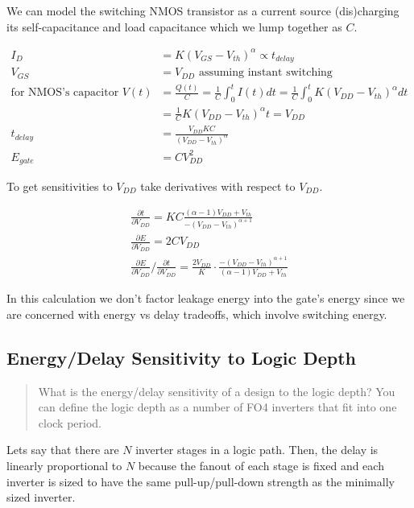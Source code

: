 \documentclass[11pt]{article}
\begin{document}
We can model the switching NMOS transistor as a current source (dis)charging its self-capacitance and load capacitance which we lump together as $C$.

\begin{align}
	I_D &= K (V_{GS} - V_{th})^\alpha \propto t_{delay} \nonumber \\
	V_{GS} &= V_{DD} \text{ assuming instant switching} \nonumber \\
	\text{for NMOS's capacitor } V(t) &= \frac{Q(t)}{C} = \frac{1}{C}\int_{0}^{t}I(t) dt = \frac{1}{C}\int_{0}^{t} K (V_{DD} - V_{th})^\alpha dt \nonumber \\
	&= \frac{1}{C} K (V_{DD} - V_{th})^\alpha t = V_{DD} \nonumber \\
	t_{delay} &= \frac{V_{DD} K C}{(V_{DD} - V_{th})^\alpha} \nonumber \\
	E_{gate} &= C V_{DD}^2 \nonumber
\end{align}

To get sensitivities to $V_{DD}$ take derivatives with respect to $V_{DD}$.

\begin{align}
	\frac{\partial t}{\partial V_{DD}} = K C \frac{(\alpha - 1)V_{DD} + V_{th}}{-(V_{DD} - V_{th})^{\alpha + 1}} \nonumber \\
	\frac{\partial E}{\partial V_{DD}} = 2 C V_{DD} \nonumber \\
	\frac{\partial E}{\partial V_{DD}} \bigg/ \frac{\partial t}{\partial V_{DD}} = \frac{2 V_{DD}}{K} \cdot \frac{-(V_{DD} - V_{th})^{\alpha+1}}{(\alpha - 1)V_{DD} + V_{th}} \nonumber 
\end{align}

In this calculation we don't factor leakage energy into the gate's energy since we are concerned with energy vs delay tradeoffs, which involve switching energy.

\subsection{Energy/Delay Sensitivity to Logic Depth}
\begin{quote}
	What is the energy/delay sensitivity of a design to the logic depth? You can define the logic depth as a number of FO4 inverters that fit into one clock period.
\end{quote}

Lets say that there are $N$ inverter stages in a logic path. Then, the delay is linearly proportional to $N$ because the fanout of each stage is fixed and each inverter is sized to have the same pull-up/pull-down strength as the minimally sized inverter.
\end{document}
